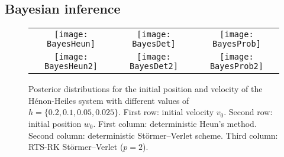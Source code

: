 \documentclass[10pt]{article}
\begin{document}
\subsection{Bayesian inference}\label{sec:BayesianInferenceEx}
\begin{figure}	
	\begin{center}
		
		\vspace{0.3cm}
		\begin{tabular}{ccc}
			\hspace{-0.32cm}\texttt{[image: BayesHeun]}  & \hspace{-0.32cm}\texttt{[image: BayesDet]}  & \hspace{-0.32cm}\texttt{[image: BayesProb]} \\ 
			\texttt{[image: BayesHeun2]} & \texttt{[image: BayesDet2]} & \texttt{[image: BayesProb2]} \\
		\end{tabular}
	\end{center}
	\caption{Posterior distributions for the initial position and velocity of the Hénon-Heiles system with different values of $h = \{0.2, 0.1, 0.05, 0.025\}$. First row: initial velocity $v_0$. Second row: initial position $w_0$. First column: deterministic Heun's method. Second column: deterministic Störmer--Verlet scheme. Third column: RTS-RK Störmer--Verlet ($p=2$).}
	\label{fig:Bayes}
\end{figure}
\end{document}
